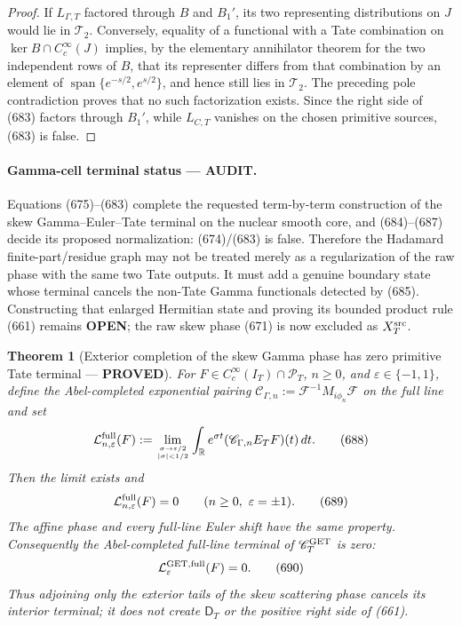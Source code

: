 \documentclass[11pt]{article}
\newtheorem{theorem}{Theorem}
\newcommand{\PROVED}{\textcolor{green!45!black}{\textbf{PROVED}}}
\newcommand{\OPEN}{\textcolor{red!70!black}{\textbf{OPEN}}}
\newcommand{\AUDIT}{\textcolor{orange!75!black}{\textbf{AUDIT}}}
\begin{document}
\begin{proof}
If \(L_{\Gamma,T}\) factored through \(B\) and \(B_1'\), its two
representing distributions on \(J\) would lie in \(\mathscr T_2\).
Conversely, equality of a functional with a Tate combination on
\(\ker B\cap C_c^\infty(J)\) implies, by the elementary annihilator theorem
for the two independent rows of \(B\), that its representer differs from
that combination by an element of
\(\operatorname{span}\{e^{-s/2},e^{s/2}\}\), and hence still lies in
\(\mathscr T_2\).  The preceding pole contradiction proves that no such
factorization exists.  Since the right side of (683) factors through
\(B_1'\), while \(L_{C,T}\) vanishes on the chosen primitive sources,
(683) is false.
\end{proof}

\paragraph{Gamma-cell terminal status --- \AUDIT.}
Equations (675)--(683) complete the requested term-by-term construction of
the skew Gamma--Euler--Tate terminal on the nuclear smooth core, and
(684)--(687) decide its proposed normalization: (674)/(683) is false.
Therefore the Hadamard finite-part/residue graph may not be treated merely
as a regularization of the raw phase with the same two Tate outputs.  It
must add a genuine boundary state whose terminal cancels the non-Tate
Gamma functionals detected by (685).  Constructing that enlarged
Hermitian state and proving its bounded product rule (661) remains
\OPEN{}; the raw skew phase (671) is now excluded as \(X_T^{\rm src}\).

\begin{theorem}[Exterior completion of the skew Gamma phase has zero
primitive Tate terminal --- \PROVED]
For \(F\in C_c^\infty(I_T)\cap\mathcal P_T\), \(n\ge0\), and
\(\varepsilon\in\{-1,1\}\), define the Abel-completed exponential pairing
\(\mathscr C_{\Gamma,n}:=
\mathcal F^{-1}M_{i\phi_n}\mathcal F\) on the full line and set
\begin{equation}
 \mathcal L_{n,\varepsilon}^{\rm full}(F)
 :=\lim_{\sigma\to\varepsilon/2\atop |\sigma|<1/2}
 \int_{\mathbb R}e^{\sigma t}
   (\mathscr C_{\Gamma,n}E_TF)(t)\,dt .              \tag{688}
\end{equation}
Then the limit exists and
\begin{equation}
 \mathcal L_{n,\varepsilon}^{\rm full}(F)=0
 \qquad(n\ge0,\ \varepsilon=\pm1).                  \tag{689}
\end{equation}
The affine phase and every full-line Euler shift have the same property.
Consequently the Abel-completed full-line terminal of
\(\mathscr C_T^{\rm GET}\) is zero:
\begin{equation}
 \mathcal L_{\varepsilon}^{\rm GET,full}(F)=0.       \tag{690}
\end{equation}
Thus adjoining only the exterior tails of the skew scattering phase
cancels its interior terminal; it does not create
\(\mathsf D_T\) or the positive right side of (661).
\end{theorem}
\end{document}
